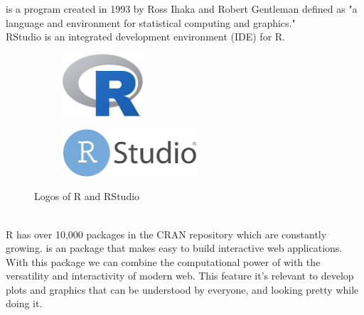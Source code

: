 \textbf{\R}  is a program created in 1993 by Ross Ihaka and Robert Gentleman  \cite{R-project website} defined as
"a language and environment for statistical computing and graphics."
\\
 RStudio is an integrated development environment (IDE) for R. \cite{rstudio}
\begin{figure}
\centering
\begin{subfigure}{.5\textwidth}
  \centering
  \includegraphics[width=3cm]{images/R.jpg}
  \label{fig:sub1}
\end{subfigure}%
\begin{subfigure}{.5\textwidth}
  \centering
  \includegraphics[width=5cm]{images/Rstudio.png}
  \label{fig:sub2}
\end{subfigure}
\caption{Logos of R and RStudio}
\label{fig:test}
\end{figure}
\\
R has over 10,000 packages in the CRAN repository which are constantly growing. 
\textbf{\Shiny} \cite{shiny} is an \R package that makes easy to build interactive web applications.
\\
With this package we can combine the computational power of \R with the versatility and interactivity of modern web. This feature it's relevant to develop plots and graphics that can be understood by everyone, and looking pretty while doing it.


